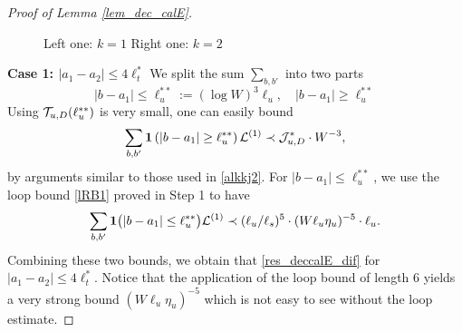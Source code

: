 \documentclass[10pt,reqno]{article}
\theoremstyle{plain} %
\theoremstyle{remark}
\numberwithin{equation}{section}
\begin{document}
\begin{proof}[Proof of Lemma \ref{lem_dec_calE}]
\begin{figure}[ht]
\caption{\hspace{.1in} Left one: $k=1$ \hspace{1.4in}Right one: $k=2$}
\label{fig:graph-6Gfor2G}
\end{figure}

\noindent 
{\bf Case 1: $|a_1-a_2|\le 4\ell_t^*$ } 
We split the sum $\sum_{b,b'}$ into two parts 
$$
|b-a_1|\le \ell_u^{** }:=(\log W)^3 \ell_u,\quad |b-a_1|\ge \ell_u^{** } 
$$
Using ${\cal T}_{u,D}(\ell_u^{** }) $ is very small,  one can easily bound 
$$
\sum_{b,b'} {\bf 1}\left(|b-a_1|\ge \ell_u^{** }\right){\cal L}^{(1)}\prec {\cal J}^*_{u,D}\cdot W^{-3},
$$
by arguments similar to those used in \eqref{alkkj2}.
For $|b-a_1|\le  \ell_u^{** } $, we use 
the loop bound \eqref{lRB1} proved in Step 1 to have 
\begin{align}\label{alkkj3}
\sum_{b,b'}{\bf 1}\big(|b-a_1|\le  \ell_u^{** }\big) {\cal L}^{(1)}  \prec (\ell_u/\ell_s)^5\cdot (W\ell_u\eta_u)^{-5} \cdot \ell_u   .
\end{align}
Combining  these two bounds, we obtain that \eqref{res_deccalE_dif} for $|a_1-a_2|\le 4\ell_t^*$. Notice that the application of the loop bound of length $6$ yields a very strong bound $(W\ell_u\eta_u)^{-5}$ which is not easy to see without the loop estimate. 

 \medskip



\end{proof}
\end{document}

